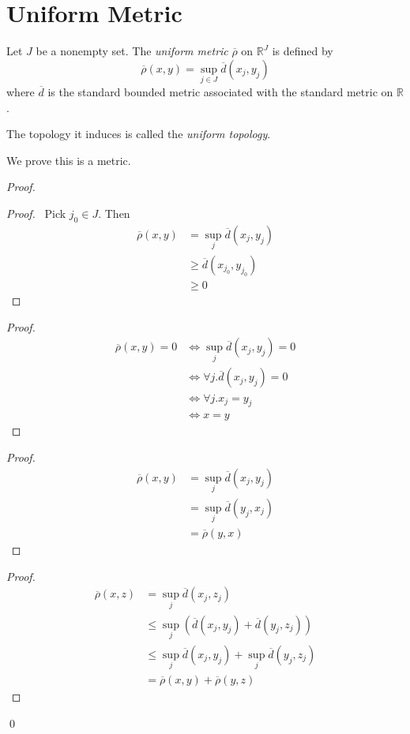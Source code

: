 \section{Uniform Metric}

\begin{df}
Let $J$ be a nonempty set.
The \emph{uniform metric} $\overline{\rho}$ on $\mathbb{R}^J$ is defined by
\[ \overline{\rho}(x,y) = \sup_{j \in J} \overline{d}(x_j,y_j) \]
where $\overline{d}$ is the standard bounded metric associated with the standard metric on $\mathbb{R}$.

The topology it induces is called the \emph{uniform topology}.

We prove this is a metric.
\end{df}

\begin{proof}
\pf
{}
\begin{proof}
	\pf\ Pick $j_0 \in J$. Then
	\begin{align*}
		\overline{\rho}(x,y) & = \sup_j \overline{d}(x_j,y_j) \\
		& \geq \overline{d}(x_{j_0},y_{j_0}) \\
		& \geq 0
	\end{align*}
\end{proof}
\begin{proof}
	\pf
	\begin{align*}
		\overline{\rho}(x,y) = 0 & \Leftrightarrow \sup_j \overline{d}(x_j,y_j) = 0 \\
		& \Leftrightarrow \forall j. \overline{d}(x_j,y_j) = 0 \\
		& \Leftrightarrow \forall j. x_j = y_j \\
		& \Leftrightarrow x = y
	\end{align*}
\end{proof}
\begin{proof}
	\pf
	\begin{align*}
		\overline{\rho}(x,y) & = \sup_j \overline{d}(x_j,y_j) \\
		& = \sup_j \overline{d}(y_j,x_j) \\
		& = \overline{\rho}(y,x)
	\end{align*}
\end{proof}
\begin{proof}
	\pf
	\begin{align*}
		\overline{\rho}(x,z) & = \sup_j \overline{d}(x_j,z_j) \\
		& \leq \sup_j (\overline{d}(x_j,y_j) + \overline{d}(y_j,z_j)) \\
		& \leq \sup_j \overline{d}(x_j,y_j) + \sup_j \overline{d}(y_j,z_j) \\
		& = \overline{\rho}(x,y) + \overline{\rho}(y,z)
	\end{align*}
\end{proof}
\qed
\end{proof}

